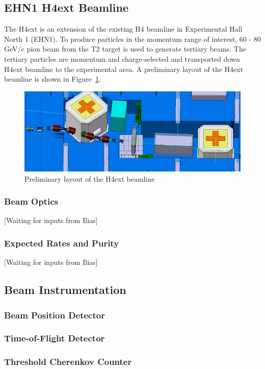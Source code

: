 \subsection{EHN1 H4ext Beamline}
The H4ext is an extension of the existing H4 beamline in Experimental Hall North 1 (EHN1).  To produce particles in the momentum range of interest, 60 - 80 GeV/c pion beam from the T2 target is used to generate tertiary beams. The tertiary particles are momentum and charge-selected and transported down H4ext beamline to the experimental area. A preliminary layout of the H4ext beamline is shown in Figure~\ref{fig:H4extPrelim}.

\begin{figure}[h]
  \centering
\includegraphics[scale=0.7]{figures/EHN1Ext_Prelim.jpg}
  \caption{Preliminary layout of the H4ext beamline  }
  \label{fig:H4extPrelim}
\end{figure}

\subsubsection{Beam Optics}
[Waiting for inputs from Ilias]

\subsubsection{Expected Rates and Purity}
[Waiting for inputs from Ilias]

\subsection{Beam Instrumentation}
\subsubsection{Beam Position Detector}
\subsubsection{Time-of-Flight Detector}
\subsubsection{Threshold Cherenkov Counter}

